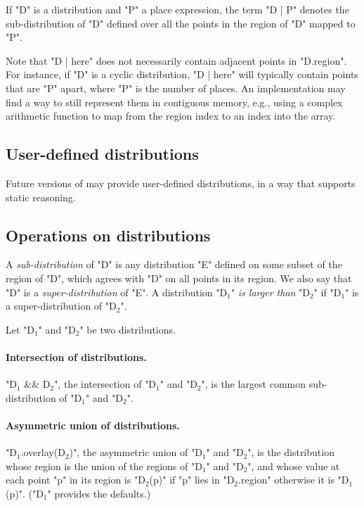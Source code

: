 If \xcd"D" is a distribution and \xcd"P" a place expression, the term
\xcd"D | P" denotes the sub-distribution of \xcd"D" defined over all the
points in the region of \xcd"D" mapped to \xcd"P".

Note that \xcd"D | here" does not necessarily contain adjacent points
in \xcd"D.region". For instance, if \xcd"D" is a cyclic distribution,
\xcd"D | here" will typically contain points that are \xcd"P" apart,
where \xcd"P" is the number of places. An implementation may find a
way to still represent them in contiguous memory, e.g., using a
complex arithmetic function to map from the region index to an index
into the array.

\subsection{User-defined distributions}

Future versions of \Xten{} may provide user-defined distributions, in
a way that supports static reasoning.

\subsection{Operations on distributions}

A {\em sub-distribution} of \xcd"D" is
any distribution \xcd"E" defined on some subset of the region of
\xcd"D", which agrees with \xcd"D" on all points in its region.
We also say that \xcd"D" is a {\em super-distribution} of
\xcd"E". A distribution \xcdmath"D$_1$" {\em is larger than}
\xcdmath"D$_2$" if \xcdmath"D$_1$" is a super-distribution of
\xcdmath"D$_2$".

Let \xcdmath"D$_1$" and \xcdmath"D$_2$" be two distributions.  


\paragraph{Intersection of distributions.}
\xcdmath"D$_1$ && D$_2$", the intersection of \xcdmath"D$_1$"
and \xcdmath"D$_2$", is the largest common sub-distribution of
\xcdmath"D$_1$" and \xcdmath"D$_2$".

\paragraph{Asymmetric union of distributions.}
\xcdmath"D$_1$.overlay(D$_2$)", the asymmetric union of
\xcdmath"D$_1$" and \xcdmath"D$_2$", is the distribution whose
region is the union of the regions of \xcdmath"D$_1$" and
\xcdmath"D$_2$", and whose value at each point \xcd"p" in its
region is \xcdmath"D$_2$(p)" if \xcdmath"p" lies in
\xcdmath"D$_2$.region" otherwise it is \xcdmath"D$_1$(p)".
(\xcdmath"D$_1$" provides the defaults.)

